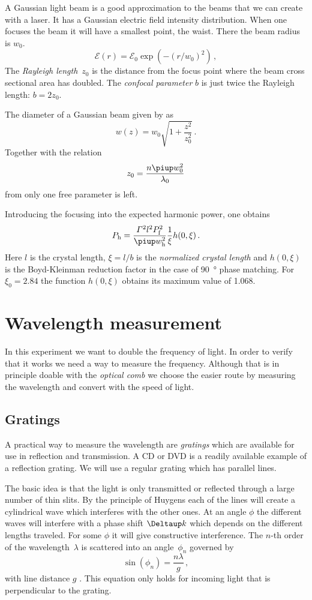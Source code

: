 \documentclass[11pt, english, fleqn, DIV=15, headinclude, BCOR=2cm]{scrreprt}
\begin{document}
A Gaussian light beam is a good approximation to the beams that we can create
with a laser. It has a Gaussian electric field intensity distribution. When one
focuses the beam it will have a smallest point, the waist. There the beam
radius is $w_0$.
\[
    \mathcal E(r) = \mathcal E_0 \exp(-(r/w_0)^2) \,,
\]
The \emph{Rayleigh length}~$z_0$ is the distance from the focus point where the
beam cross sectional area has doubled. The \emph{confocal parameter} $b$ is
just twice the Rayleigh length: $b = 2 z_0$.

The diameter of a Gaussian beam given by \parencite{wikipedia/gaussian_beam} as
\[
    w(z) = w_0 \sqrt{1 + \frac{z^2}{z_0^2}} \,.
\]
Together with the relation
\[
    z_0 = \frac{n \piup w_0^2}{\lambda_0}
\]
from \parencite{wikipedia/rayleighleange} only one free parameter is left.

Introducing the focusing into the expected harmonic power, one obtains
\[
    P_\mathrm h
    = \frac{\Gamma^2 l^2 P_\mathrm f^2}{\piup w_\mathrm h^2} \frac1\xi h(0,
    \xi) \,.
\]
Here $l$ is the crystal length, $\xi = l / b$ is the \emph{normalized crystal
length} and $h(0, \xi)$ is the Boyd-Kleinman reduction factor in the case of
\SI{90}{\degree} phase matching. For $\xi_0 = 2.84$ the function $h(0, \xi)$
obtains its maximum value of \num{1.068}.

\section{Wavelength measurement}

In this experiment we want to double the frequency of light. In order to verify
that it works we need a way to measure the frequency. Although that is in
principle doable with the \emph{optical comb} we choose the easier route by
measuring the wavelength and convert with the speed of light.

\subsection{Gratings}

A practical way to measure the wavelength are \emph{gratings} which are
available for use in reflection and transmission. A CD or DVD is a readily
available example of a reflection grating. We will use a regular grating which
has parallel lines.

The basic idea is that the light is only transmitted or reflected through a
large number of thin slits. By the principle of Huygens each of the lines will
create a cylindrical wave which interferes with the other ones. At an angle
$\phi$ the different waves will interfere with a phase shift $\Deltaup k$ which
depends on the different lengths traveled. For some $\phi$ it will give
constructive interference. The $n$-th order of the wavelength~$\lambda$ is
scattered into an angle~$\phi_n$ governed by
\begin{equation}
    \label{eq:phi_grating}
    \sin(\phi_n) = \frac{n \lambda}{g} \,,
\end{equation}
with line distance $g$ \parencite{wikipedia/optisches_gitter}. This equation
only holds for incoming light that is perpendicular to the grating.
\end{document}
